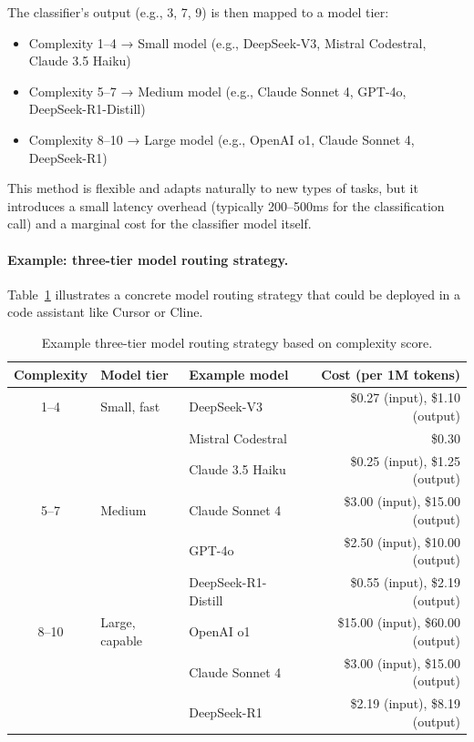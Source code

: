 \documentclass[english]{article}
\begin{document}
\begin{enumerate}
    The classifier's output (e.g., 3, 7, 9) is then mapped to a model tier:
    \begin{itemize}
        \item Complexity 1--4 → Small model (e.g., DeepSeek-V3, Mistral Codestral, Claude 3.5 Haiku)
        \item Complexity 5--7 → Medium model (e.g., Claude Sonnet 4, GPT-4o, DeepSeek-R1-Distill)
        \item Complexity 8--10 → Large model (e.g., OpenAI o1, Claude Sonnet 4, DeepSeek-R1)
    \end{itemize}

    This method is flexible and adapts naturally to new types of tasks, but it introduces a small latency overhead (typically 200--500ms for the classification call) and a marginal cost for the classifier model itself.
\end{enumerate}

\paragraph{Example: three-tier model routing strategy.}

Table~\ref{tab:model_routing_tiers} illustrates a concrete model routing strategy that could be deployed in a code assistant like Cursor or Cline.

\begin{table}[H]
\centering
\caption{Example three-tier model routing strategy based on complexity score.}
\label{tab:model_routing_tiers}
\begin{tabular}{|c|l|l|r|}
\hline
\textbf{Complexity} & \textbf{Model tier} & \textbf{Example model} & \textbf{Cost (per 1M tokens)} \\
\hline
1--4 & Small, fast & DeepSeek-V3 & \$0.27 (input), \$1.10 (output) \\
     &             & Mistral Codestral & \$0.30 \\
     &             & Claude 3.5 Haiku & \$0.25 (input), \$1.25 (output) \\
\hline
5--7 & Medium & Claude Sonnet 4 & \$3.00 (input), \$15.00 (output) \\
     &        & GPT-4o & \$2.50 (input), \$10.00 (output) \\
     &        & DeepSeek-R1-Distill & \$0.55 (input), \$2.19 (output) \\
\hline
8--10 & Large, capable & OpenAI o1 & \$15.00 (input), \$60.00 (output) \\
      &                & Claude Sonnet 4 & \$3.00 (input), \$15.00 (output) \\
      &                & DeepSeek-R1 & \$2.19 (input), \$8.19 (output) \\
\hline
\end{tabular}
\end{table}
\end{document}

